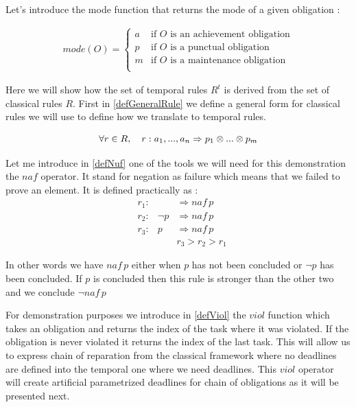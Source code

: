 \documentclass[10pt]{report}
\begin{document}
Let's introduce the mode function that returns the mode of a given obligation :

\begin{gather}
mode(O) = \begin{cases}
a & \text{if $O$ is an achievement obligation}\\
p & \text{if $O$ is a punctual obligation}\\
m & \text{if $O$ is a maintenance obligation}\\
\end{cases}
\end{gather}

Here we will show how the set of temporal rules $R^{t}$ is derived from the set of classical rules $R$. First in \ref{defGeneralRule} we define a general form for classical rules we will use to define how we translate to temporal rules.

\begin{equation} \label{defGeneralRule}
\forall r \in R, \quad r :  a_{1}, ..., a_{n} \Rightarrow p_{1} \otimes ... \otimes p_{m} \\
\end{equation}

Let me introduce in \ref{defNuf} one of the tools we will need for this demonstration the $naf$ operator. It stand for negation as failure which means that we failed to prove an element. It is defined practically as : 
\begin{equation}\label{defnaf}
\begin{aligned} 
&r_{1} :& &\Rightarrow naf\,p \\
&r_{2} :& \neg p &\Rightarrow naf\,p \\
&r_{3} :& p &\Rightarrow naf\,p \\
& & &r_{3} > r_{2} > r_{1} 
\end{aligned}
\end{equation}

In other words we have $naf\,p$ either when $p$ has not been concluded or $\neg p$ has been concluded. If $p$ is concluded then this rule is stronger than the other two and we conclude $\neg naf\,p$

For demonstration purposes we introduce in \ref{defViol} the $viol$ function which takes an obligation and returns the index of the task where it was violated. If the obligation is never violated it returns the index of the last task. This will allow us to express chain of reparation from the classical framework where no deadlines are defined into the temporal one where we need deadlines. This $viol$ operator will create artificial parametrized deadlines for chain of obligations as it will be presented next.
\end{document}
